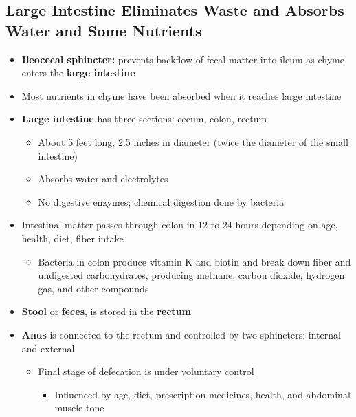 \documentclass[12pt]{article}
\begin{document}
        \subsection{Large Intestine Eliminates Waste and Absorbs Water and Some Nutrients}
            \begin{itemize}
                \item \textbf{Ileocecal sphincter:} prevents backflow of fecal matter into ileum as chyme enters the \textbf{large intestine}
                \item Most nutrients in chyme have been absorbed when it reaches large intestine
                \item \textbf{Large intestine} has three sections: cecum, colon, rectum
                    \begin{itemize}
                        \item About 5 feet long, 2.5 inches in diameter (twice the diameter of the small intestine)
                        \item Absorbs water and electrolytes
                        \item No digestive enzymes; chemical digestion done by bacteria
                    \end{itemize}
                \item Intestinal matter passes through colon in 12 to 24 hours depending on age, health, diet, fiber intake
                    \begin{itemize}
                        \item Bacteria in colon produce vitamin K and biotin and break down fiber and undigested carbohydrates, producing methane, carbon dioxide, hydrogen gas, and other compounds
                    \end{itemize}
                \item \textbf{Stool} or \textbf{feces}, is stored in the \textbf{rectum}
                \item \textbf{Anus} is connected to the rectum and controlled by two sphincters: internal and external
                    \begin{itemize}
                        \item Final stage of defecation is under voluntary control
                            \begin{itemize}
                                \item Influenced by age, diet, prescription medicines, health, and abdominal muscle tone
                            \end{itemize}
                    \end{itemize}
            \end{itemize}
        
\end{document}

